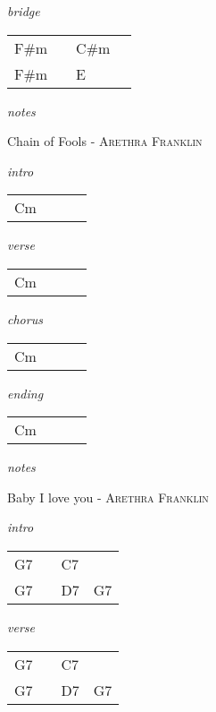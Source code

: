 \documentclass[12pt]{article}
\begin{document}
\textit{bridge}

\begin{tabular}{|P{1.25in}|P{1.25in}|P{1.25in}|P{1.25in}|}
  F\#m &   & C\#m  &   \\
  F\#m &   &  E    & \\
\end{tabular}

\textit{notes}
  

\newpage

{\Huge Chain of Fools} {\huge - \textsc{Arethra Franklin}}

\huge
\textit{intro}

\begin{tabular}{|P{1.25in}|P{1.25in}|P{1.25in}|P{1.25in}|}
  Cm &   &   &   \\
\end{tabular}

\textit{verse}

\begin{tabular}{|P{1.25in}|P{1.25in}|P{1.25in}|P{1.25in}|}
  Cm &   &   &   \\
\end{tabular}

\textit{chorus}

\begin{tabular}{|P{1.25in}|P{1.25in}|P{1.25in}|P{1.25in}|}
  Cm &   &   &   \\
\end{tabular}

\textit{ending}

\begin{tabular}{|P{1.25in}|P{1.25in}|P{1.25in}|P{1.25in}|}
  Cm &   &   &   \\
\end{tabular}

\textit{notes}

\newpage

{\Huge Baby I love you} {\huge - \textsc{Arethra Franklin}}

\huge
\textit{intro}

\begin{tabular}{|P{1.25in}|P{1.25in}|P{1.25in}|P{1.25in}|}
  G7 &   & C7  &   \\
  G7 &   & D7  & G7 \\
\end{tabular}

\textit{verse}

\begin{tabular}{|P{1.25in}|P{1.25in}|P{1.25in}|P{1.25in}|}
  G7 &   & C7  &   \\
  G7 &   & D7  & G7 \\
\end{tabular}
\end{document}

